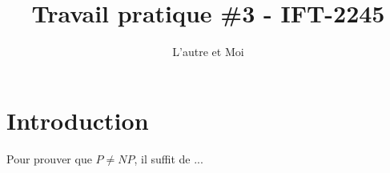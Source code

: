 \documentclass{article}
\title{Travail pratique \#3 - IFT-2245}
\author{L'autre et Moi}
\begin{document}
\maketitle

\section{Introduction}

Pour prouver que $P \not= NP$, il suffit de ...
\end{document}
